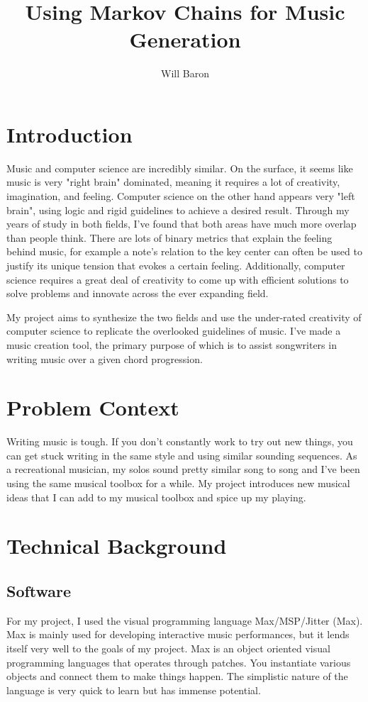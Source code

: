 \documentclass[10pt,twocolumn]{article}
\title{Using Markov Chains for Music Generation}
\author{Will Baron}
\affiliation{Occidental College}
\begin{document}
\maketitle

\section{Introduction}

Music and computer science are incredibly similar. On the surface, it seems like music is very "right brain" dominated, meaning it requires a lot of creativity, imagination, and feeling. Computer science on the other hand appears very "left brain", using logic and rigid guidelines to achieve a desired result. Through my years of study in both fields, I've found that both areas have much more overlap than people think. There are lots of binary metrics that explain the feeling behind music, for example a note's relation to the key center can often be used to justify its unique tension that evokes a certain feeling. Additionally, computer science requires a great deal of creativity to come up with efficient solutions to solve problems and innovate across the ever expanding field.\newline

My project aims to synthesize the two fields and use the under-rated creativity of computer science to replicate the overlooked guidelines of music. I've made a music creation tool, the primary purpose of which is to assist songwriters in writing music over a given chord progression.

\section{Problem Context}

Writing music is tough. If you don't constantly work to try out new things, you can get stuck writing in the same style and using similar sounding sequences. As a recreational musician, my solos sound pretty similar song to song and I've been using the same musical toolbox for a while. My project introduces new musical ideas that I can add to my musical toolbox and spice up my playing.

\section{Technical Background}

\subsection{Software}
        For my project, I used the visual programming language Max/MSP/Jitter (Max). Max is mainly used for developing interactive music performances, but it lends itself very well to the goals of my project. Max is an object oriented visual programming languages that operates through patches\cite{Max}. You instantiate various objects and connect them to make things happen. The simplistic nature of the language is very quick to learn but has immense potential.
        
\end{document}
